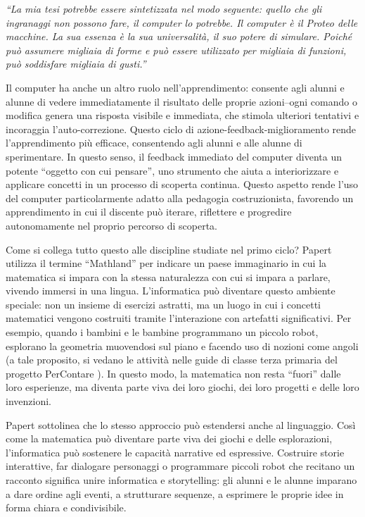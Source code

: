 \emph{``La mia tesi potrebbe essere sintetizzata nel modo seguente: quello che gli ingranaggi non possono fare, il computer lo potrebbe. Il computer è il Proteo delle macchine. La sua essenza è la sua universalità, il suo potere di simulare. Poiché può assumere migliaia di forme e può essere utilizzato per migliaia di funzioni, può soddisfare migliaia di gusti.''}


Il computer ha anche un altro ruolo nell'apprendimento: consente agli alunni e alunne di vedere immediatamente il risultato delle proprie azioni--ogni comando o modifica genera una risposta visibile e immediata, che stimola ulteriori tentativi e incoraggia l'auto-correzione. Questo ciclo di azione-feedback-miglioramento rende l'apprendimento più efficace, consentendo agli alunni e alle alunne di sperimentare. In questo senso, il feedback immediato del computer diventa un potente ``oggetto con cui pensare'', uno strumento che aiuta a interiorizzare e applicare concetti in un processo di scoperta continua. Questo aspetto rende l'uso del computer particolarmente adatto alla pedagogia costruzionista, favorendo un apprendimento in cui il discente può iterare, riflettere e progredire autonomamente nel proprio percorso di scoperta.

Come si collega tutto questo alle discipline studiate nel primo ciclo? Papert utilizza il termine ``Mathland'' per indicare un paese immaginario in cui la matematica si impara con la stessa naturalezza con cui si impara a parlare, vivendo immersi in una lingua. L'informatica può diventare questo ambiente speciale: non un insieme di esercizi astratti, ma un luogo in cui i concetti matematici vengono costruiti tramite l'interazione con artefatti significativi. Per esempio, quando i bambini e le bambine programmano un piccolo robot, esplorano la geometria muovendosi sul piano e facendo uso di nozioni come angoli (a tale proposito, si vedano le attività nelle guide di classe terza primaria del progetto PerContare ). In questo modo, la matematica non resta ``fuori'' dalle loro esperienze, ma diventa parte viva dei loro giochi, dei loro progetti e delle loro invenzioni.

Papert sottolinea che lo stesso approccio può estendersi anche al linguaggio. Così come la matematica può diventare parte viva dei giochi e delle esplorazioni, l'informatica può sostenere le capacità narrative ed espressive. Costruire storie interattive, far dialogare personaggi o programmare piccoli robot che recitano un racconto significa unire informatica e storytelling: gli alunni e le alunne imparano a dare ordine agli eventi, a strutturare sequenze, a esprimere le proprie idee in forma chiara e condivisibile.


